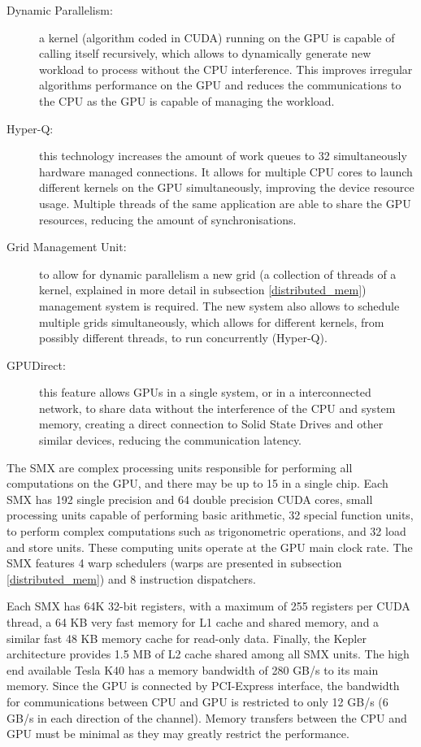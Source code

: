 \begin{description}
	\item[Dynamic Parallelism:] a kernel (algorithm coded in CUDA) running on the GPU is capable of calling itself recursively, which allows to dynamically generate new workload to process without the CPU interference. This improves irregular algorithms performance on the GPU and reduces the communications to the CPU as the GPU is capable of managing the workload.
	\item[Hyper-Q:] this technology increases the amount of work queues to 32 simultaneously hardware managed connections. It allows for multiple CPU cores to launch different kernels on the GPU simultaneously, improving the device resource usage. Multiple threads of the same application are able to share the GPU resources, reducing the amount of synchronisations.
	\item[Grid Management Unit:] to allow for dynamic parallelism a new grid (a collection of threads of a kernel, explained in more detail in subsection \ref{distributed_mem}) management system is required. The new system also allows to schedule multiple grids simultaneously, which allows for different kernels, from possibly different threads, to run concurrently (Hyper-Q).
	\item[\nvidia GPUDirect:] this feature allows GPUs in a single system, or in a interconnected network, to share data without the interference of the CPU and system memory, creating a direct connection to Solid State Drives and other similar devices, reducing the communication latency.
\end{description}

The SMX are complex processing units responsible for performing all computations on the GPU, and there may be up to 15 in a single chip. Each SMX has 192 single precision and 64 double precision CUDA cores, small processing units capable of performing basic arithmetic, 32 special function units, to perform complex computations such as trigonometric operations, and 32 load and store units. These computing units operate at the GPU main clock rate. The SMX features 4 warp schedulers (warps are presented in subsection \ref{distributed_mem}) and 8 instruction dispatchers.

Each SMX has 64K 32-bit registers, with a maximum of 255 registers per CUDA thread, a 64 KB very fast memory for L1 cache and shared memory, and a similar fast 48 KB memory cache for read-only data. Finally, the Kepler architecture provides 1.5 MB of L2 cache shared among all SMX units. The high end available Tesla K40 has a memory bandwidth of 280 GB/s to its main memory. Since the GPU is connected by PCI-Express interface, the bandwidth for communications between CPU and GPU is restricted to only 12 GB/s (6 GB/s in each direction of the channel). Memory transfers between the CPU and GPU must be minimal as they may greatly restrict the performance.

